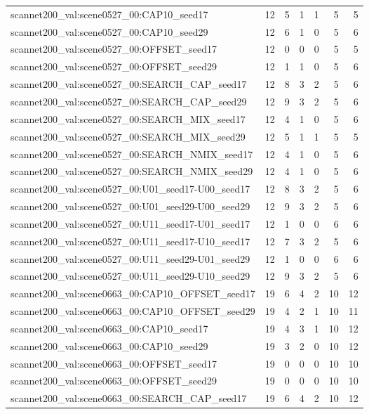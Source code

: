 \begin{table}[t]
\begin{tabular}{lrrrrrr}
scannet200\_val:scene0527\_00:CAP10\_seed17 & 12 & 5 & 1 & 1 & 5 & 5 \\
scannet200\_val:scene0527\_00:CAP10\_seed29 & 12 & 6 & 1 & 0 & 5 & 6 \\
scannet200\_val:scene0527\_00:OFFSET\_seed17 & 12 & 0 & 0 & 0 & 5 & 5 \\
scannet200\_val:scene0527\_00:OFFSET\_seed29 & 12 & 1 & 1 & 0 & 5 & 6 \\
scannet200\_val:scene0527\_00:SEARCH\_CAP\_seed17 & 12 & 8 & 3 & 2 & 5 & 6 \\
scannet200\_val:scene0527\_00:SEARCH\_CAP\_seed29 & 12 & 9 & 3 & 2 & 5 & 6 \\
scannet200\_val:scene0527\_00:SEARCH\_MIX\_seed17 & 12 & 4 & 1 & 0 & 5 & 6 \\
scannet200\_val:scene0527\_00:SEARCH\_MIX\_seed29 & 12 & 5 & 1 & 1 & 5 & 5 \\
scannet200\_val:scene0527\_00:SEARCH\_NMIX\_seed17 & 12 & 4 & 1 & 0 & 5 & 6 \\
scannet200\_val:scene0527\_00:SEARCH\_NMIX\_seed29 & 12 & 4 & 1 & 0 & 5 & 6 \\
scannet200\_val:scene0527\_00:U01\_seed17-U00\_seed17 & 12 & 8 & 3 & 2 & 5 & 6 \\
scannet200\_val:scene0527\_00:U01\_seed29-U00\_seed29 & 12 & 9 & 3 & 2 & 5 & 6 \\
scannet200\_val:scene0527\_00:U11\_seed17-U01\_seed17 & 12 & 1 & 0 & 0 & 6 & 6 \\
scannet200\_val:scene0527\_00:U11\_seed17-U10\_seed17 & 12 & 7 & 3 & 2 & 5 & 6 \\
scannet200\_val:scene0527\_00:U11\_seed29-U01\_seed29 & 12 & 1 & 0 & 0 & 6 & 6 \\
scannet200\_val:scene0527\_00:U11\_seed29-U10\_seed29 & 12 & 9 & 3 & 2 & 5 & 6 \\
scannet200\_val:scene0663\_00:CAP10\_OFFSET\_seed17 & 19 & 6 & 4 & 2 & 10 & 12 \\
scannet200\_val:scene0663\_00:CAP10\_OFFSET\_seed29 & 19 & 4 & 2 & 1 & 10 & 11 \\
scannet200\_val:scene0663\_00:CAP10\_seed17 & 19 & 4 & 3 & 1 & 10 & 12 \\
scannet200\_val:scene0663\_00:CAP10\_seed29 & 19 & 3 & 2 & 0 & 10 & 12 \\
scannet200\_val:scene0663\_00:OFFSET\_seed17 & 19 & 0 & 0 & 0 & 10 & 10 \\
scannet200\_val:scene0663\_00:OFFSET\_seed29 & 19 & 0 & 0 & 0 & 10 & 10 \\
scannet200\_val:scene0663\_00:SEARCH\_CAP\_seed17 & 19 & 6 & 4 & 2 & 10 & 12 \\

\end{tabular}
\end{table}
